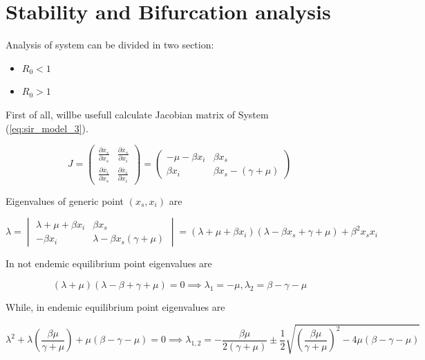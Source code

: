 \section{Stability and Bifurcation analysis}
Analysis of system can be divided in two section:
\begin{itemize}
    \item $R_0 < 1$
    \item $R_0 > 1$
\end{itemize}



First of all, willbe usefull calculate Jacobian matrix of System (\ref{eq:sir_model_3}).

\begin{equation}
    J = 
    \begin{pmatrix}
        \frac{\partial \dot{x_s}}{\partial x_s} & \frac{\partial \dot{x_s}}{\partial x_i} \\
        \frac{\partial \dot{x_i}}{\partial x_s} & \frac{\partial \dot{x_i}}{\partial x_i}
    \end{pmatrix} =
    \begin{pmatrix}
        -\mu-\beta x_i & \beta x_s \\ \beta x_i & \beta x_s -(\gamma + \mu)
    \end{pmatrix}
\end{equation}

Eigenvalues of generic point $(x_s,x_i)$ are

\begin{equation}
    \label{eq:eigenvalues}
    \lambda = 
    \begin{vmatrix}
        \lambda + \mu + \beta x_i & \beta x_s \\
        -\beta x_i & \lambda - \beta x_s  (\gamma + \mu)
    \end{vmatrix}
    = (\lambda + \mu + \beta x_i)(\lambda - \beta x_s + \gamma + \mu ) + \beta^2 x_s x_i
\end{equation}

In not endemic equilibrium point eigenvalues are

\begin{equation}
    \label{eq:eigenvalues_ne}
    (\lambda + \mu)(\lambda - \beta + \gamma + \mu) = 0 \implies \lambda_1 = - \mu, \lambda_2 = \beta-\gamma-\mu
\end{equation}

While, in endemic equilibrium point eigenvalues are

\begin{equation}
    \label{eq:eigenvalues_e}
    \lambda^2+\lambda\left(\frac{\beta\mu}{\gamma + \mu}\right)+\mu(\beta-\gamma-\mu) = 0 \implies \lambda_{1,2} = -\frac{\beta\mu}{2(\gamma + \mu)} \pm \frac{1}{2}\sqrt{\left(\frac{\beta\mu}{\gamma + \mu}\right)^2-4\mu(\beta-\gamma-\mu)}
\end{equation}

